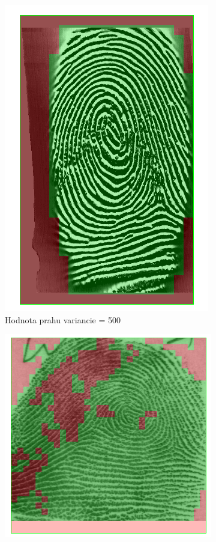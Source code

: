 \documentclass[11pt,a4paper]{article}
\begin{document}
\begin{figure}[h!]
\begin{subfigure}{0.33\textwidth}
		\includegraphics[width=.95\linewidth]{images/Screenshot_6}
		\caption{Hodnota prahu variancie = 500}
		\label{fig:gull2}
	\end{subfigure}%
	\begin{subfigure}{0.33\textwidth}
		\centering
		\includegraphics[width=.95\linewidth]{images/Screenshot_7}

\end{subfigure}
\end{figure}
\end{document}
